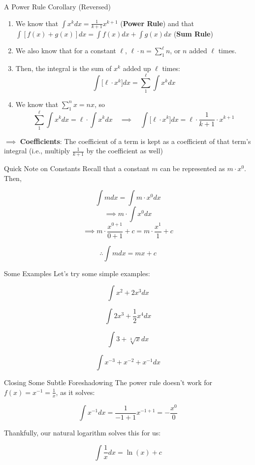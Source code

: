 \documentclass[10pt]{beamer}
\begin{document}
\begin{frame}{A Power Rule Corollary (Reversed)}
    \begin{enumerate}
        \item We know that $\int x^k dx = \frac{1}{k+1} x^{k + 1}$ (\textbf{Power Rule}) and that $\int [f(x) + g(x)] dx = \int f(x) dx + \int g(x) dx$ (\textbf{Sum Rule})
        \item We also know that for a constant $\ell$, $\ell \cdot n = \sum_1^\ell n$, or $n$ added $\ell$ times. 
        \item Then, the integral is the sum of $x^k$ added up $\ell$ times:
        \[\int \bigg[ \ell \cdot x^k\bigg] dx = \sum_1^\ell \int x^k dx\]
        \item We know that $\sum_1^n x = nx$, so
        \[\sum_1^\ell \int x^k dx = \ell \cdot \int x^k dx \quad \implies \quad \int \bigg[ \ell \cdot x^k \bigg] dx = \ell \cdot \frac{1}{k+1} \cdot x^{k + 1}\]
    \end{enumerate}

    $\implies$  \textbf{Coefficients}: The coefficient of a term is kept as a coefficient of that term's integral (i.e., multiply $\frac{1}{k+1}$ by the coefficient as well)
\end{frame}

\begin{frame}{Quick Note on Constants}
    Recall that a constant $m$ can be represented as $m \cdot x^0$. Then,

    \[\int mdx = \int m \cdot x^0 dx\]
    \[\implies m \cdot \int x^0 dx\]
    \[\implies m \cdot \frac{x^{0+1}}{0+1} + c= m \cdot \frac{x^1}{1} + c\]
    
    \[\therefore \int m dx = mx + c\]
\end{frame}

\begin{frame}{Some Examples}
    Let's try some simple examples:

    \[\int x^2 + 2x^3 dx\] \pause

    \[\int 2x^3 + \frac{1}{2} x^4  dx \] \pause

    \[\int 3 + \sqrt[3]{x} dx\] \pause

    \[\int x^{-3} + x^{-2} + x^{-1} dx\] 
\end{frame}

\begin{frame}{Closing Some Subtle Foreshadowing}
    The power rule doesn't work for $f(x) = x^{-1} = \frac{1}{x}$, as it solves:

    \[\int x^{-1} dx = \frac{1}{-1+1} x^{-1 + 1} = - \frac{x^0}{0}\]

    Thankfully, our natural logarithm solves this for us:

    \[\int \frac{1}{x} dx = \ln(x) + c\]
\end{frame}
\end{document}
